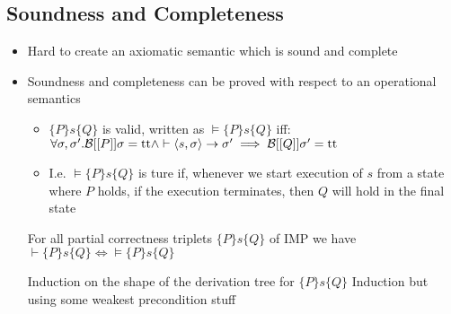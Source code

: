 \subsection{Soundness and Completeness}
\begin{itemize}
     If a property can be prove then it does indeed hold
        \begin{itemize}
            \item $\vdash \{P\} s \{Q\}  \implies \models \{P\} s \{Q\}$
        \end{itemize}
     If a property does hold then it can be proved
        \begin{itemize}
            \item $\models \{P\} s \{Q\} \implies \vdash \{P\} s \{Q\}$
        \end{itemize}
    \item Hard to create an axiomatic semantic which is sound and complete
    \item Soundness and completeness can be proved with respect to an operational semantics
        \begin{itemize}
            \item $\{P\} s \{Q\}$ is valid, written as $\models \{P\} s \{Q\}$ iff:\\ $\forall \sigma, \sigma'. \mathcal{B}[[P]]\sigma = \text{tt} \wedge \vdash \langle s, \sigma \rangle \to \sigma' \implies \mathcal{B}[[Q]] \sigma' = \text{tt}$
            \item I.e. $\models \{P\} s \{Q\}$ is ture if, whenever we start execution of $s$ from a state where $P$ holds, if the execution terminates, then $Q$ will hold in the final state
        \end{itemize}
     For all partial correctness triplets $\{P\} s \{Q\}$ of IMP we have $\vdash \{P\} s \{Q\} \iff \models \{P\} s \{Q\}$
        \begin{itemize}
                \begin{itemize}
                    \ides{$\mathbf{\Rightarrow}$:} Induction on the shape of the derivation tree for $\{P\} s \{Q\}$
                    \ides{$\mathbf{\Leftarrow}$:} Induction but using some weakest precondition stuff
                \end{itemize}
        \end{itemize}
\end{itemize}
